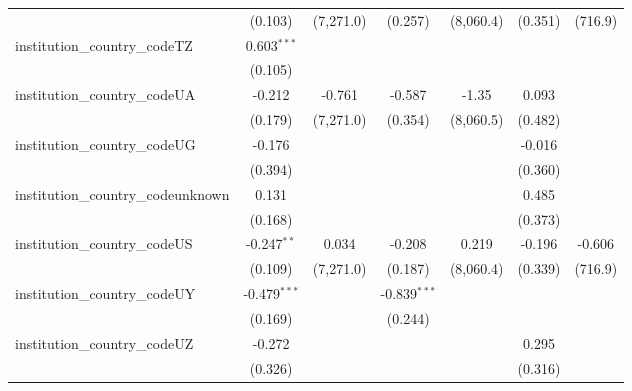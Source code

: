 \begin{tabular}{lcccccc}
                                         & (0.103)        & (7,271.0)     & (0.257)        & (8,060.4)      & (0.351)        & (716.9)\\   
   institution\_country\_codeTZ          & 0.603$^{***}$  &               &                &                &                &   \\   
                                         & (0.105)        &               &                &                &                &   \\   
   institution\_country\_codeUA          & -0.212         & -0.761        & -0.587         & -1.35          & 0.093          &   \\   
                                         & (0.179)        & (7,271.0)     & (0.354)        & (8,060.5)      & (0.482)        &   \\   
   institution\_country\_codeUG          & -0.176         &               &                &                & -0.016         &   \\   
                                         & (0.394)        &               &                &                & (0.360)        &   \\   
   institution\_country\_codeunknown     & 0.131          &               &                &                & 0.485          &   \\   
                                         & (0.168)        &               &                &                & (0.373)        &   \\   
   institution\_country\_codeUS          & -0.247$^{**}$  & 0.034         & -0.208         & 0.219          & -0.196         & -0.606\\   
                                         & (0.109)        & (7,271.0)     & (0.187)        & (8,060.4)      & (0.339)        & (716.9)\\   
   institution\_country\_codeUY          & -0.479$^{***}$ &               & -0.839$^{***}$ &                &                &   \\   
                                         & (0.169)        &               & (0.244)        &                &                &   \\   
   institution\_country\_codeUZ          & -0.272         &               &                &                & 0.295          &   \\   
                                         & (0.326)        &               &                &                & (0.316)        &   \\   

\end{tabular}
